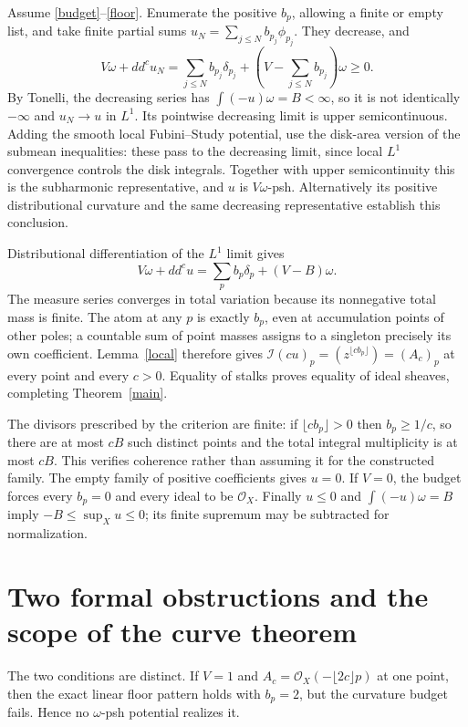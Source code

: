 \documentclass[11pt]{article}
\newcommand{\OO}{\mathcal O}
\newcommand{\II}{\mathcal I}
\begin{document}
Assume \eqref{budget}--\eqref{floor}. Enumerate the positive $b_p$, allowing a finite or empty list, and take finite partial sums $u_N=\sum_{j\leq N}b_{p_j}\phi_{p_j}$. They decrease, and
\[
 V\omega+dd^cu_N=\sum_{j\leq N}b_{p_j}\delta_{p_j}
 +\left(V-\sum_{j\leq N}b_{p_j}\right)\omega\geq0.
\]
By Tonelli, the decreasing series has $\int(-u)\omega=B<\infty$, so it is not identically $-\infty$ and $u_N\to u$ in $L^1$. Its pointwise decreasing limit is upper semicontinuous. Adding the smooth local Fubini--Study potential, use the disk-area version of the submean inequalities: these pass to the decreasing limit, since local $L^1$ convergence controls the disk integrals. Together with upper semicontinuity this is the subharmonic representative, and $u$ is $V\omega$-psh. Alternatively its positive distributional curvature and the same decreasing representative establish this conclusion.

Distributional differentiation of the $L^1$ limit gives
\[
 V\omega+dd^cu=\sum_p b_p\delta_p+(V-B)\omega.
\]
The measure series converges in total variation because its nonnegative total mass is finite. The atom at any $p$ is exactly $b_p$, even at accumulation points of other poles; a countable sum of point masses assigns to a singleton precisely its own coefficient. Lemma~\ref{local} therefore gives $\II(cu)_p=(z^{\lfloor cb_p\rfloor})=(A_c)_p$ at every point and every $c>0$. Equality of stalks proves equality of ideal sheaves, completing Theorem~\ref{main}.

The divisors prescribed by the criterion are finite: if $\lfloor cb_p\rfloor>0$ then $b_p\geq1/c$, so there are at most $cB$ such distinct points and the total integral multiplicity is at most $cB$. This verifies coherence rather than assuming it for the constructed family. The empty family of positive coefficients gives $u=0$. If $V=0$, the budget forces every $b_p=0$ and every ideal to be $\OO_X$. Finally $u\leq0$ and $\int(-u)\omega=B$ imply $-B\leq\sup_Xu\leq0$; its finite supremum may be subtracted for normalization.

\section{Two formal obstructions and the scope of the curve theorem}
The two conditions are distinct. If $V=1$ and $A_c=\OO_X(-\lfloor2c\rfloor p)$ at one point, then the exact linear floor pattern holds with $b_p=2$, but the curvature budget fails. Hence no $\omega$-psh potential realizes it.
\end{document}
